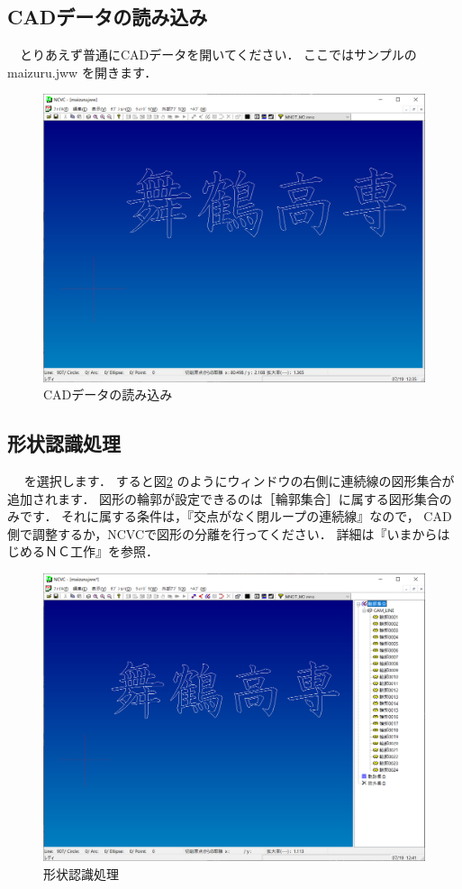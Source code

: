 

\subsection{CADデータの読み込み}
　とりあえず普通にCADデータを開いてください．
ここではサンプルの maizuru.jww を開きます．

\begin{figure}[H]
\centering
\includegraphics[scale=0.5]{No1/fig/maizuru1.png}
\caption{CADデータの読み込み}
\label{fig:maizuru1.png}
\end{figure}

\subsection{形状認識処理}
　 を選択します．
すると図\ref{fig:maizuru2.png} のようにウィンドウの右側に連続線の図形集合が追加されます．
図形の輪郭が設定できるのは［輪郭集合］に属する図形集合のみです．
それに属する条件は，『交点がなく閉ループの連続線』なので，
CAD側で調整するか，NCVCで図形の分離を行ってください．
詳細は『いまからはじめるＮＣ工作』を参照．

\begin{figure}[H]
\centering
\includegraphics[scale=0.5]{No1/fig/maizuru2.png}
\caption{形状認識処理}
\label{fig:maizuru2.png}
\end{figure}
